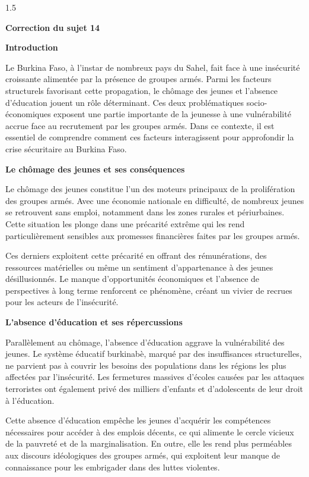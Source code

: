 \documentclass[12pt]{article}
\begin{document}
\begin{spacing}{1.5}
\quad

\textbf{Correction du sujet 14}



\textbf{Introduction}

Le Burkina Faso, à l’instar de nombreux pays du Sahel, fait face à une insécurité croissante alimentée par la présence de groupes armés. Parmi les facteurs structurels favorisant cette propagation, le chômage des jeunes et l'absence d'éducation jouent un rôle déterminant. Ces deux problématiques socio-économiques exposent une partie importante de la jeunesse à une vulnérabilité accrue face au recrutement par les groupes armés. Dans ce contexte, il est essentiel de comprendre comment ces facteurs interagissent pour approfondir la crise sécuritaire au Burkina Faso.

\quad

\textbf{Le chômage des jeunes et ses conséquences}

Le chômage des jeunes constitue l’un des moteurs principaux de la prolifération des groupes armés. Avec une économie nationale en difficulté, de nombreux jeunes se retrouvent sans emploi, notamment dans les zones rurales et périurbaines. Cette situation les plonge dans une précarité extrême qui les rend particulièrement sensibles aux promesses financières faites par les groupes armés.

Ces derniers exploitent cette précarité en offrant des rémunérations, des ressources matérielles ou même un sentiment d’appartenance à des jeunes désillusionnés. Le manque d’opportunités économiques et l’absence de perspectives à long terme renforcent ce phénomène, créant un vivier de recrues pour les acteurs de l’insécurité.

\quad

\textbf{L'absence d'éducation et ses répercussions}

Parallèlement au chômage, l'absence d'éducation aggrave la vulnérabilité des jeunes. Le système éducatif burkinabè, marqué par des insuffisances structurelles, ne parvient pas à couvrir les besoins des populations dans les régions les plus affectées par l’insécurité. Les fermetures massives d'écoles causées par les attaques terroristes ont également privé des milliers d'enfants et d'adolescents de leur droit à l'éducation.

Cette absence d’éducation empêche les jeunes d'acquérir les compétences nécessaires pour accéder à des emplois décents, ce qui alimente le cercle vicieux de la pauvreté et de la marginalisation. En outre, elle les rend plus perméables aux discours idéologiques des groupes armés, qui exploitent leur manque de connaissance pour les embrigader dans des luttes violentes.


\end{spacing}
\end{document}
